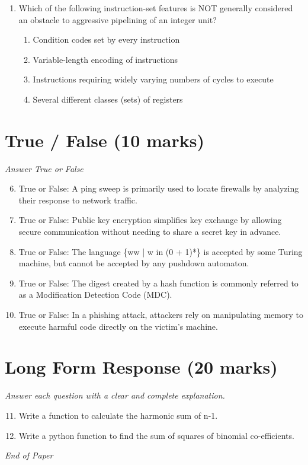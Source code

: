 \documentclass[12pt]{article}
\begin{document}
\begin{enumerate}[label=\arabic*.]
\begin{enumerate}[label=(\alph*)]
    \item n
    \item n + 1
    \item n + 2
    \item 2 n
\end{enumerate}
\item Which of the following instruction-set features is NOT generally considered an obstacle to aggressive pipelining of an integer unit?
\begin{enumerate}[label=(\alph*)]
    \item Condition codes set by every instruction
    \item Variable-length encoding of instructions
    \item Instructions requiring widely varying numbers of cycles to execute
    \item Several different classes (sets) of registers
\end{enumerate}
\end{enumerate}

\section*{True / False (10 marks)}
\textit{Answer True or False}
\begin{enumerate}[label=\arabic*.]
\setcounter{enumi}{5}
\item True or False: A ping sweep is primarily used to locate firewalls by analyzing their response to network traffic.
\item True or False: Public key encryption simplifies key exchange by allowing secure communication without needing to share a secret key in advance.
\item True or False: The language \{ww | w in (0 + 1)*\} is accepted by some Turing machine, but cannot be accepted by any pushdown automaton.
\item True or False: The digest created by a hash function is commonly referred to as a Modification Detection Code (MDC).
\item True or False: In a phishing attack, attackers rely on manipulating memory to execute harmful code directly on the victim's machine.
\end{enumerate}

\section*{Long Form Response (20 marks)}
\textit{Answer each question with a clear and complete explanation.}
\begin{enumerate}[label=\arabic*.]
\setcounter{enumi}{10}
\item Write a function to calculate the harmonic sum of n-1.
\item Write a python function to find the sum of squares of binomial co-efficients.
\end{enumerate}

\vfill
\noindent\textit{End of Paper}
\end{document}
